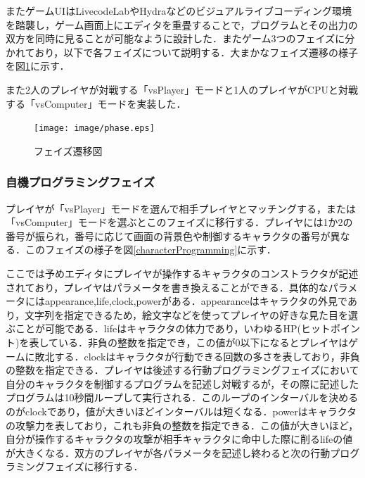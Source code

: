 またゲームUIはLivecodeLab\cite{livecodelab}やHydra\cite{hydra}などのビジュアルライブコーディング環境を踏襲し，ゲーム画面上にエディタを重畳することで，プログラムとその出力の双方を同時に見ることが可能なように設計した．またゲーム3つのフェイズに分かれており，以下で各フェイズについて説明する．大まかなフェイズ遷移の様子を図\ref{phase}に示す．

また2人のプレイヤが対戦する「vsPlayer」モードと1人のプレイヤがCPUと対戦する「vsComputer」モードを実装した．

\begin{figure}[!ht]
  \begin{center}
    \texttt{[image: image/phase.eps]}
  \end{center}
    \vspace{-8mm} 
  \caption{フェイズ遷移図}
  \label{phase}
\end{figure}

\subsubsection{自機プログラミングフェイズ}
プレイヤが「vsPlayer」モードを選んで相手プレイヤとマッチングする，または「vsComputer」モードを選ぶとこのフェイズに移行する．プレイヤには1か2の番号が振られ，番号に応じて画面の背景色や制御するキャラクタの番号が異なる．このフェイズの様子を図\ref{characterProgramming}に示す．

ここでは予めエディタにプレイヤが操作するキャラクタのコンストラクタが記述されており，プレイヤはパラメータを書き換えることができる．具体的なパラメータにはappearance,life,clock,powerがある．appearanceはキャラクタの外見であり，文字列を指定できるため，絵文字などを使ってプレイヤの好きな見た目を選ぶことが可能である．lifeはキャラクタの体力であり，いわゆるHP(ヒットポイント)を表している．非負の整数を指定でき，この値が0以下になるとプレイヤはゲームに敗北する．clockはキャラクタが行動できる回数の多さを表しており，非負の整数を指定できる．プレイヤは後述する行動プログラミングフェイズにおいて自分のキャラクタを制御するプログラムを記述し対戦するが，その際に記述したプログラムは10秒間ループして実行される．このループのインターバルを決めるのがclockであり，値が大きいほどインターバルは短くなる．powerはキャラクタの攻撃力を表しており，これも非負の整数を指定できる．この値が大きいほど，自分が操作するキャラクタの攻撃が相手キャラクタに命中した際に削るlifeの値が大きくなる．双方のプレイヤが各パラメータを記述し終わると次の行動プログラミングフェイズに移行する．

